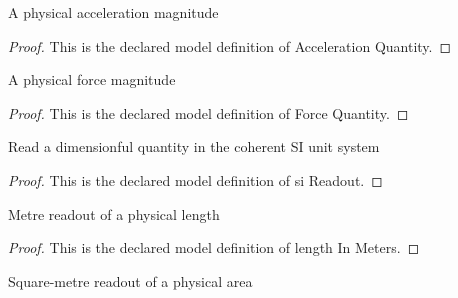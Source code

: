 \begin{definition}
  \label{def:physics:phyx-mini-0664:phyxminiproblems-problemphyxmini0664-accelerationquantity}
  A physical acceleration magnitude
\end{definition}
\begin{proof}
  This is the declared model definition of Acceleration Quantity.
\end{proof}
\begin{definition}
  \label{def:physics:phyx-mini-0664:phyxminiproblems-problemphyxmini0664-forcequantity}
  A physical force magnitude
\end{definition}
\begin{proof}
  This is the declared model definition of Force Quantity.
\end{proof}
\begin{definition}[si Readout]
  \label{def:physics:phyx-mini-0664:phyxminiproblems-problemphyxmini0664-sireadout}
  Read a dimensionful quantity in the coherent SI unit system
\end{definition}
\begin{proof}
  This is the declared model definition of si Readout.
\end{proof}
\begin{definition}
  \label{def:physics:phyx-mini-0664:phyxminiproblems-problemphyxmini0664-lengthinmeters}
  Metre readout of a physical length
\end{definition}
\begin{proof}
  This is the declared model definition of length In Meters.
\end{proof}
\begin{definition}
  \label{def:physics:phyx-mini-0664:phyxminiproblems-problemphyxmini0664-areainsquaremeters}
  Square-metre readout of a physical area
\end{definition}
